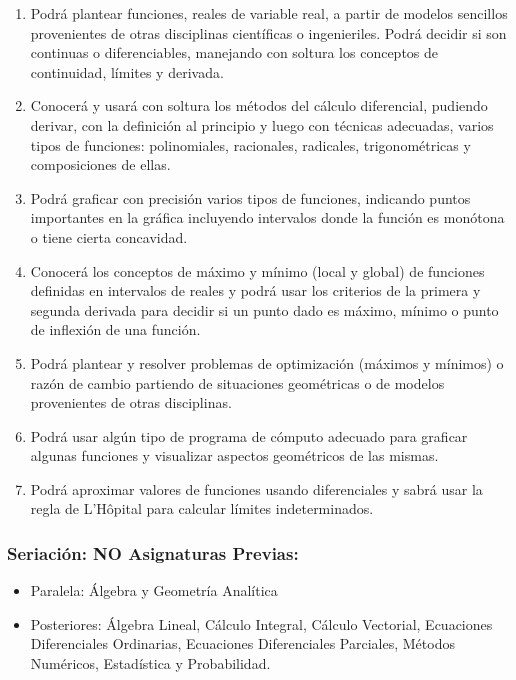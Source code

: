 \documentclass[12pt]{article}
\begin{document}
\begin{enumerate}
\def\labelenumi{\arabic{enumi}.}
\item
  Podrá plantear funciones, reales de variable real, a partir de modelos
  sencillos provenientes de otras disciplinas científicas o
  ingenieriles. Podrá decidir si son continuas o diferenciables,
  manejando con soltura los conceptos de continuidad, límites y
  derivada.
\item
  Conocerá y usará con soltura los métodos del cálculo diferencial,
  pudiendo derivar, con la definición al principio y luego con técnicas
  adecuadas, varios tipos de funciones: polinomiales, racionales,
  radicales, trigonométricas y composiciones de ellas.
\item
  Podrá graficar con precisión varios tipos de funciones, indicando
  puntos importantes en la gráfica incluyendo intervalos donde la
  función es monótona o tiene cierta concavidad.
\item
  Conocerá los conceptos de máximo y mínimo (local y global) de
  funciones definidas en intervalos de reales y podrá usar los criterios
  de la primera y segunda derivada para decidir si un punto dado es
  máximo, mínimo o punto de inflexión de una función.
\item
  Podrá plantear y resolver problemas de optimización (máximos y
  mínimos) o razón de cambio partiendo de situaciones geométricas o de
  modelos provenientes de otras disciplinas.
\item
  Podrá usar algún tipo de programa de cómputo adecuado para graficar
  algunas funciones y visualizar aspectos geométricos de las mismas.
\item
  Podrá aproximar valores de funciones usando diferenciales y sabrá usar
  la regla de L'Hôpital para calcular límites indeterminados.
\end{enumerate}

\subsubsection{Seriación: NO Asignaturas
Previas:}\label{seriaciuxf3n-no-asignaturas-previas}

\begin{itemize}
\item
  Paralela: Álgebra y Geometría Analítica
\item
  Posteriores: Álgebra Lineal, Cálculo Integral, Cálculo Vectorial,
  Ecuaciones Diferenciales Ordinarias, Ecuaciones Diferenciales
  Parciales, Métodos Numéricos, Estadística y Probabilidad.
\end{itemize}
\end{document}

